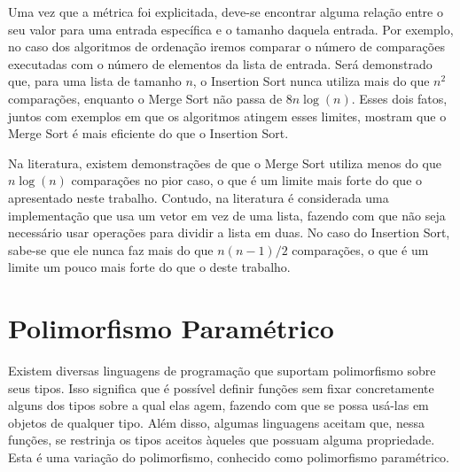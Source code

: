 \documentclass[12pt, oneside, a4paper,english,brazil]{abntex2}
\begin{document}
\qquad Uma vez que a m\'etrica foi explicitada, deve-se encontrar alguma rela\c{c}\~ao entre o seu valor para
uma entrada espec\'ifica e o tamanho daquela entrada. Por exemplo, no caso dos algoritmos de ordena\c{c}\~ao
iremos comparar o n\'umero de compara\c{c}\~oes executadas com o n\'umero de elementos da lista de entrada.
Ser\'a demonstrado que, para uma lista de tamanho $n$, o Insertion Sort nunca utiliza mais do que $n^{2}$ compara\c{c}\~oes, enquanto o Merge Sort n\~ao passa de $8 n \log (n)$. Esses dois fatos,
juntos com exemplos em que os algoritmos atingem esses limites, mostram que o Merge Sort \'e mais eficiente
do que o Insertion Sort.

\qquad Na literatura, existem demonstra\c{c}\~oes de que o Merge Sort utiliza menos do que $n\log(n)$
compara\c{c}\~oes no pior caso\cite{1}, o que \'e um limite mais forte do que o apresentado neste trabalho. Contudo, na literatura \'e considerada uma implementa\c{c}\~ao que usa um vetor em vez de uma lista,
fazendo com que n\~ao seja necess\'ario usar opera\c{c}\~oes para dividir a lista em duas. No caso do Insertion Sort, sabe-se que ele nunca faz mais do
que $n(n - 1) / 2$ compara\c{c}\~oes, o que \'e um limite um pouco mais forte
do que o deste trabalho.




\section{Polimorfismo Param\'etrico}

\qquad Existem diversas linguagens de programa\c{c}\~ao que suportam polimorfismo sobre seus tipos. Isso
significa que \'e poss\'ivel definir fun\c{c}\~oes sem fixar concretamente alguns dos tipos sobre a qual elas
agem, fazendo com que se possa us\'a-las em objetos de qualquer tipo. Al\'em disso, algumas linguagens
aceitam que, nessa fun\c{c}\~oes, se restrinja os tipos aceitos \`aqueles que possuam alguma propriedade.
Esta \'e uma varia\c{c}\~ao do polimorfismo, conhecido como polimorfismo param\'etrico.
\end{document}
